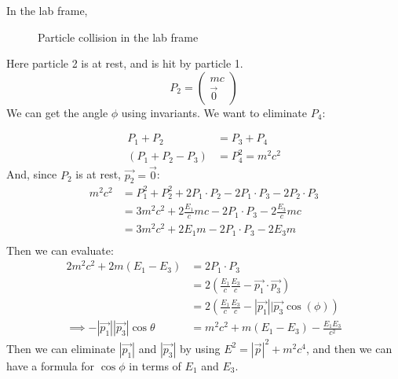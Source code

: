 \documentclass[../Main.tex]{subfiles}
\begin{document}
In the lab frame,
\begin{figure}[ht]
    \centering
    \caption{Particle collision in the lab frame}
    \label{figCollisionLab}
\end{figure}

Here particle 2 is at rest, and is hit by particle 1.
\begin{equation*}
    P_2 = \begin{pmatrix}mc \\ \vec{0}\end{pmatrix}
\end{equation*}
We can get the angle $\phi$ using invariants. We want to eliminate $P_4$:

\begin{align*}
    P_1 + P_2 &= P_3 + P_4 \\
    \left(P_1 + P_2 - P_3\right) &= P_4^2 = m^2 c^2
\end{align*}
And, since $P_2$ is at rest, $\vec{p_2} = \vec{0}$:
\begin{align*}
    m^2 c^2 &= P_1^2 + P_2^2 + 2P_1 \cdot P_2 - 2P_1 \cdot P_3 - 2P_2 \cdot P_3 \\
    &= 3m^2 c^2 + 2\frac{E_1}{c} mc - 2P_1 \cdot P_3 - 2\frac{E_3}{c} mc \\
    &= 3m^2 c^2 + 2E_1m - 2P_1 \cdot P_3 - 2E_3m \\
\end{align*}
Then we can evaluate:
\begin{align*}
    2m^2 c^2 + 2m(E_1 - E_3) &= 2P_1 \cdot P_3 \\
    &= 2\left(\frac{E_1}{c} \frac{E_3}{c} - \vec{p_1} \cdot \vec{p_3}\right) \\
    &= 2\left(\frac{E_1}{c} \frac{E_3}{c} - |\vec{p_1}||\vec{p_3}\cos(\phi)\right) \\
    \implies -|\vec{p_1}||\vec{p_3}| \cos{\theta} &= m^2 c^2 + m(E_1 - E_3) - \frac{E_1 E_3}{c^2}
\end{align*}
Then we can eliminate $|\vec{p_1}|$ and $|\vec{p_3}|$ by using $E^2 = |\vec{p}|^2 + m^2 c^4$, and then we can have a formula for $\cos{\phi}$ in terms of $E_1$ and $E_3$.
\end{document}
